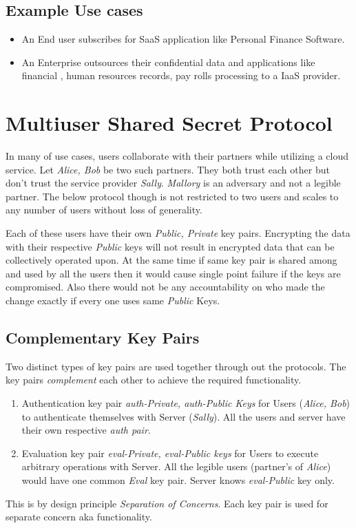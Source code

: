 \documentclass[conference]{IEEEtran}
\numberwithin{equation}{section}
\begin{document}
\subsection{Example Use cases}
\begin{itemize}
\item An End user subscribes for SaaS application like Personal Finance Software.
\item An Enterprise outsources their confidential data and applications like financial , human resources records, pay rolls processing to a IaaS provider. 
\end{itemize}
\section{Multiuser Shared Secret Protocol}

In many of use cases, users collaborate with their partners while utilizing a cloud service. Let \emph{Alice, Bob} be two such partners. They both trust each other but don't trust the service provider \emph{Sally}. \emph{Mallory} is an adversary and not a legible partner. The below protocol though is not restricted to two users and scales to any number of users without loss of generality.

Each of these users have their own \emph{Public, Private} key pairs. Encrypting the data with their respective \emph{Public} keys will not result in encrypted data that can be collectively operated upon. At the same time if same key pair is shared among and used by all the users then it would cause single point failure if the keys are compromised. Also there would not be any accountability on who made the change exactly if every one uses same \emph{Public} Keys.
\subsection{Complementary Key Pairs}
 Two distinct types of key pairs are used together through out the protocols. The key pairs \emph{complement} each other to achieve the required functionality.
\begin{enumerate}
\item  Authentication key pair \emph{auth-Private, auth-Public Keys} for Users (\emph{Alice, Bob}) to authenticate
themselves with Server (\emph{Sally}). All the users and server have their own respective \emph{auth pair}.
\item Evaluation key pair \emph{eval-Private, eval-Public keys} for Users to execute arbitrary operations
with Server. All the legible users (partner's of \emph{Alice}) would have one common \emph{Eval} key pair. Server knows \emph{eval-Public} key only.
\end{enumerate}
This is by design principle \emph{Separation of Concerns}. Each key pair is used for separate concern aka functionality.
\end{document}
